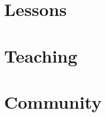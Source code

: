 \documentclass[11pt]{memoir}
\begin{document}
\maketitle
\newpage
\tableofcontents



\part{Lessons}







\part{Teaching}






\part{Community}






\appendix



\end{document}
